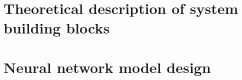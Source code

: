 \documentclass[fleqn,a4paper,12pt]{report}
\begin{document}






%
%
%
%
%
\tableofcontents
%
%

\chapter{ Theoretical description of system building blocks}


\chapter{ Neural network model design}


%
%
%
%



\begingroup
\raggedright


\endgroup
\end{document}
